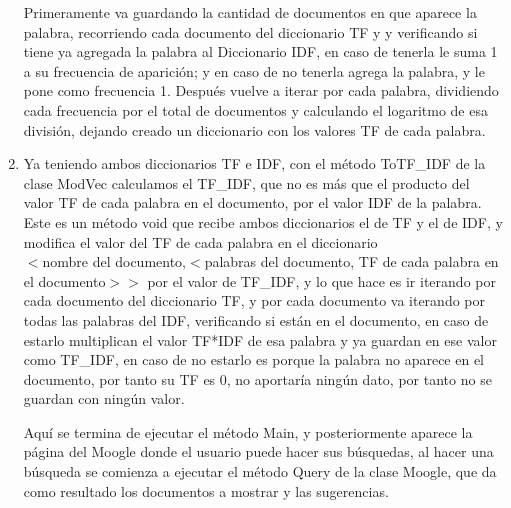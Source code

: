 \documentclass[12pt, a4paper]{article}
\begin{document}
\begin{enumerate}
            Primeramente va guardando
            la cantidad de documentos en que aparece la palabra, recorriendo cada documento
            del diccionario TF y y verificando si tiene ya agregada la palabra al
            Diccionario IDF, en caso de tenerla le suma 1 a su frecuencia de aparición;
            y en caso de no tenerla agrega la palabra, y le pone como frecuencia 1.
            Después vuelve a iterar por cada palabra, dividiendo cada frecuencia por el total
            de documentos y calculando el logaritmo de esa división, dejando creado un
            diccionario con los valores TF de cada palabra.

      \item Ya teniendo ambos diccionarios TF e IDF, con el método ToTF\_IDF de la clase ModVec
            calculamos el TF\_IDF, que no es más que el producto del valor TF de cada palabra
            en el documento, por el valor IDF de la palabra. Este es un método void que
            recibe ambos diccionarios el de TF y el de IDF, y modifica el valor del TF de cada
            palabra en el diccionario\\
            $<$nombre del documento,$<$palabras del documento, TF de cada palabra en el documento$>>$
            por el valor de TF\_IDF, y lo que hace es ir iterando por cada documento del
            diccionario TF, y por cada documento
            va iterando por todas las palabras del IDF, verificando si están en el documento,
            en caso de estarlo multiplican el valor TF*IDF de esa palabra y ya guardan en ese
            valor como TF\_IDF, en caso de no estarlo es porque la palabra no aparece en el documento,
            por tanto su TF es 0, no aportaría ningún dato, por tanto no se guardan con ningún valor.
            
            Aquí se termina de ejecutar el método Main, y posteriormente aparece la página del Moogle
            donde el usuario puede hacer sus búsquedas, al hacer una búsqueda se comienza a ejecutar
            el método Query de la clase Moogle, que da como resultado los documentos a mostrar y
            las sugerencias.
            
            \end{enumerate}
\end{document}
